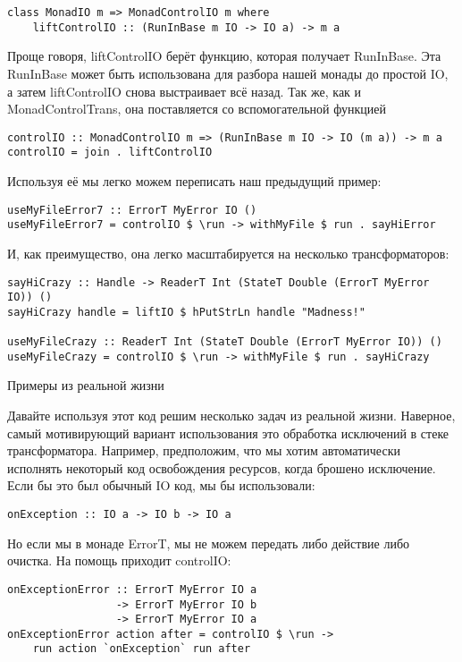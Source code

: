\begin{lstlisting}
class MonadIO m => MonadControlIO m where
    liftControlIO :: (RunInBase m IO -> IO a) -> m a
\end{lstlisting}

Проще говоря, liftControlIO берёт функцию, которая получает RunInBase. Эта RunInBase может быть использована для разбора нашей монады до простой IO, а затем liftControlIO снова выстраивает всё назад. Так же, как и MonadControlTrans, она поставляется со вспомогательной функцией

\begin{lstlisting}
controlIO :: MonadControlIO m => (RunInBase m IO -> IO (m a)) -> m a
controlIO = join . liftControlIO
\end{lstlisting}

Используя её мы легко можем переписать наш предыдущий пример:

\begin{lstlisting}
useMyFileError7 :: ErrorT MyError IO ()
useMyFileError7 = controlIO $ \run -> withMyFile $ run . sayHiError
\end{lstlisting}

И, как преимущество, она легко масштабируется на несколько трансформаторов:

\begin{lstlisting}
sayHiCrazy :: Handle -> ReaderT Int (StateT Double (ErrorT MyError IO)) ()
sayHiCrazy handle = liftIO $ hPutStrLn handle "Madness!"

useMyFileCrazy :: ReaderT Int (StateT Double (ErrorT MyError IO)) ()
useMyFileCrazy = controlIO $ \run -> withMyFile $ run . sayHiCrazy
\end{lstlisting}

Примеры из реальной жизни

Давайте используя этот код решим несколько задач из реальной жизни. Наверное, самый мотивирующий вариант использования это обработка исключений в стеке трансформатора. Например, предположим, что мы хотим автоматически исполнять некоторый код освобождения ресурсов, когда брошено исключение. Если бы это был обычный IO код, мы бы использовали:

\begin{lstlisting}
onException :: IO a -> IO b -> IO a
\end{lstlisting}

Но если мы в монаде ErrorT, мы не можем передать либо действие либо очистка. На помощь приходит controlIO:

\begin{lstlisting}
onExceptionError :: ErrorT MyError IO a
                 -> ErrorT MyError IO b
                 -> ErrorT MyError IO a
onExceptionError action after = controlIO $ \run ->
    run action `onException` run after
\end{lstlisting}

